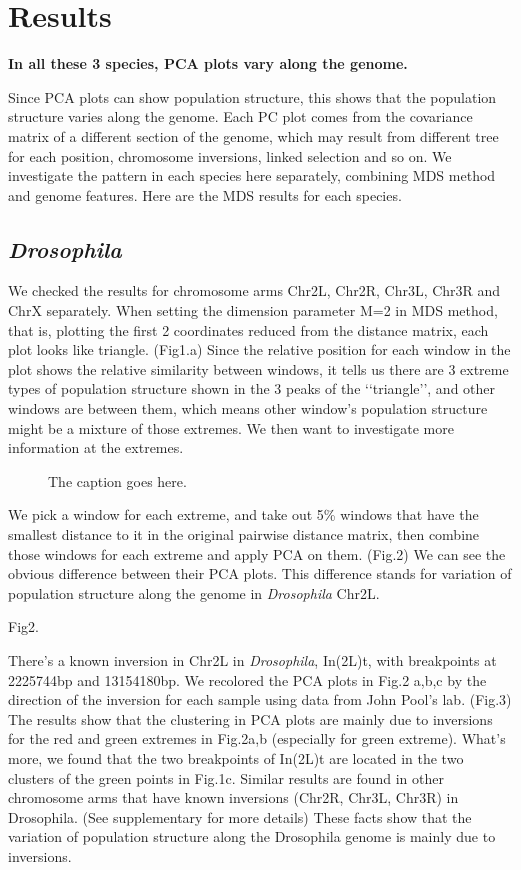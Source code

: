 \documentclass[11pt, oneside]{article}   	%
\begin{document}
{\section{Results}
\textbf{In all these 3 species, PCA plots vary along the genome.}

Since PCA plots can show population structure, this shows that the population structure varies along the genome. Each PC plot comes from the covariance matrix of a different section of the genome, which may result from different tree for each position, chromosome inversions, linked selection and so on. We investigate the pattern in each species here separately, combining MDS method and genome features.
Here are the MDS results for each species.
\subsection{\textit{Drosophila}}
We checked the results for chromosome arms Chr2L, Chr2R, Chr3L, Chr3R and ChrX separately. When setting the dimension parameter M=2 in MDS method, that is, plotting the first 2 coordinates reduced from the distance matrix, each plot looks like triangle.
(Fig1.a) Since the relative position for each window in the plot shows the relative similarity between windows, it tells us there are 3 extreme types of population structure shown in the 3 peaks of the \lq\lq triangle\rq\rq, and other windows are between them, which means other window's population structure might be a mixture of those extremes. We then want to investigate more information at the extremes.

\begin{figure}
    \begin{center}
    \end{center}
    \caption{
        The caption goes here.
        \label{fig:pde_clines}
    }
\end{figure}


We pick a window for each extreme, and take out 5\% windows that have the smallest distance to it in the original pairwise distance matrix, then combine those windows for each extreme and apply PCA on them. (Fig.2) We can see the obvious difference between their PCA plots. This difference stands for variation of population structure along the genome in \textit{Drosophila} Chr2L.

Fig2.

There's a known inversion in Chr2L in \textit{Drosophila}, In(2L)t, with breakpoints at 2225744bp and 13154180bp. \cite{key11} We recolored the PCA plots in Fig.2 a,b,c by the direction of the inversion for each sample using data from John Pool's lab. (Fig.3) The results show that the clustering in PCA plots are mainly due to inversions for the red and green extremes in Fig.2a,b (especially for green extreme). What's more, we found that the two breakpoints of In(2L)t are located in the two clusters of the green points in Fig.1c. Similar results are found in other chromosome arms that have known inversions (Chr2R,
Chr3L, Chr3R) in Drosophila. (See supplementary for more details) These facts show that the variation of population structure along the Drosophila genome is mainly due to inversions.

}
\end{document}
